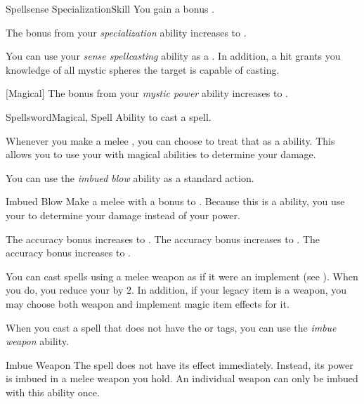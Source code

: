 \begin{feat}{Spellsense Specialization}{Skill}
         You gain a  bonus  .

         The bonus from your \textit{specialization} ability increases to .

         You can use your \textit{sense spellcasting} ability as a .
        In addition, a hit grants you knowledge of all mystic spheres the target is capable of casting.

        [Magical] The bonus from your \textit{mystic power} ability increases to .
    \end{feat}

    \begin{feat}{Spellsword}{Magical, Spell}
        \featpre Ability to cast a spell.

         Whenever you make a melee , you can choose to treat that as a  ability.
        This allows you to use your  with magical abilities to determine your damage.

         You can use the \textit{imbued blow} ability as a standard action.
        \begin{freeability}{Imbued Blow}
            Make a melee  with a  bonus to .
            Because this is a  ability, you use your   to determine your damage instead of your  power.

            \rankline
             The accuracy bonus increases to .
             The accuracy bonus increases to .
             The accuracy bonus increases to .
        \end{freeability}

         You can cast spells using a melee weapon as if it were an implement (see ).
        When you do, you reduce your  by 2.
        In addition, if your legacy item is a weapon, you may choose both weapon and implement magic item effects for it.

         When you cast a spell that does not have the  or  tags,
            you can use the \textit{imbue weapon} ability.
        \begin{attuneability}{Imbue Weapon}
            \rankline
            The spell does not have its effect immediately.
            Instead, its power is imbued in a melee weapon you hold.
            An individual weapon can only be imbued with this ability once.


\end{attuneability}
\end{feat}

